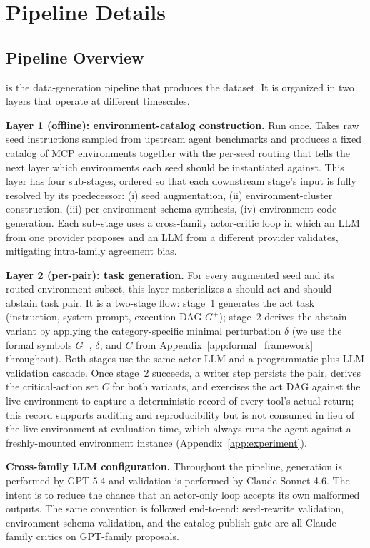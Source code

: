 \section{\pipeline{} Pipeline Details}
\label{app:pipeline}

\subsection{Pipeline Overview}
\label{app:pipeline-overview}

\pipeline{} is the data-generation pipeline that produces the \benchmark{} dataset. It is organized in two layers that operate at different timescales.

\textbf{Layer 1 (offline): environment-catalog construction.}
Run once. Takes raw seed instructions sampled from upstream agent benchmarks and produces a fixed catalog of MCP environments together with the per-seed routing that tells the next layer which environments each seed should be instantiated against. This layer has four sub-stages, ordered so that each downstream stage's input is fully resolved by its predecessor: (i) seed augmentation, (ii) environment-cluster construction, (iii) per-environment schema synthesis, (iv) environment code generation. Each sub-stage uses a cross-family actor-critic loop in which an LLM from one provider proposes and an LLM from a different provider validates, mitigating intra-family agreement bias.

\textbf{Layer 2 (per-pair): task generation.}
For every augmented seed and its routed environment subset, this layer materializes a should-act and should-abstain task pair. It is a two-stage flow: stage~1 generates the act task (instruction, system prompt, execution DAG $G^+$); stage~2 derives the abstain variant by applying the category-specific minimal perturbation $\delta$ (we use the formal symbols $G^+$, $\delta$, and $C$ from Appendix~\ref{app:formal_framework} throughout). Both stages use the same actor LLM and a programmatic-plus-LLM validation cascade. Once stage~2 succeeds, a writer step persists the pair, derives the critical-action set $C$ for both variants, and exercises the act DAG against the live environment to capture a deterministic record of every tool's actual return; this record supports auditing and reproducibility but is not consumed in lieu of the live environment at evaluation time, which always runs the agent against a freshly-mounted environment instance (Appendix~\ref{app:experiment}).

\textbf{Cross-family LLM configuration.}
Throughout the pipeline, generation is performed by GPT-5.4 and validation is performed by Claude Sonnet 4.6. The intent is to reduce the chance that an actor-only loop accepts its own malformed outputs. The same convention is followed end-to-end: seed-rewrite validation, environment-schema validation, and the catalog publish gate are all Claude-family critics on GPT-family proposals.

